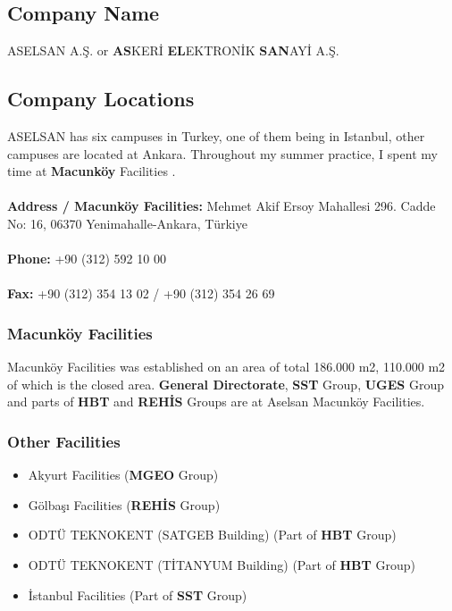 \subsection{Company Name}
\-
\indent ASELSAN A.Ş. or \textbf{AS}KERİ \textbf{EL}EKTRONİK \textbf{SAN}AYİ A.Ş.


\subsection{Company Locations}
\-\indent
	ASELSAN has six campuses in Turkey, one of them being in Istanbul, other campuses are located at Ankara. Throughout my summer practice, I spent my time at \textbf{Macunköy} Facilities . 
\\
\\
\textbf{ Address / Macunköy Facilities:} Mehmet Akif Ersoy Mahallesi 296. Cadde No: 16, 06370 Yenimahalle-Ankara, Türkiye
\\
\\
\textbf{ Phone:} +90 (312) 592 10 00
\\
\\
\textbf{ Fax:} +90 (312) 354 13 02 / +90 (312) 354 26 69


\subsubsection{Macunköy Facilities}
\- \indent

	Macunköy Facilities was established on an area of total 186.000 m2, 110.000 m2 of which is the closed area. \textbf{General Directorate}, \textbf{SST} Group, \textbf{UGES} Group and parts of \textbf{HBT} and \textbf{REHİS} Groups are at Aselsan Macunköy Facilities.



\subsubsection{Other Facilities}


\begin{itemize}
\item Akyurt Facilities (\textbf{MGEO} Group)
\item Gölbaşı Facilities (\textbf{REHİS} Group)
\item ODTÜ TEKNOKENT (SATGEB Building) (Part of \textbf{HBT} Group)
\item ODTÜ TEKNOKENT (TİTANYUM Building) (Part of \textbf{HBT} Group)
\item İstanbul Facilities (Part of \textbf{SST} Group)
\end{itemize}



